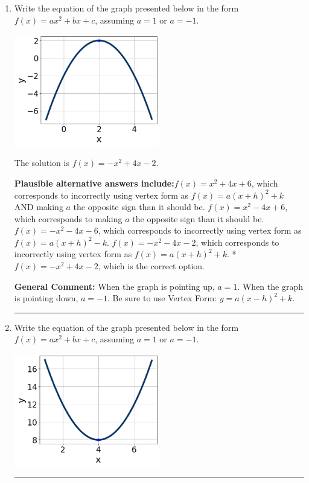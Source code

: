 \documentclass{extbook}[14pt]
\newcommand{\litem}[1]{\item #1

\rule{\textwidth}{0.4pt}}
\begin{document}
\begin{enumerate}\litem{
Write the equation of the graph presented below in the form $f(x)=ax^2+bx+c$, assuming  $a=1$ or $a=-1$.

\begin{center}
    \includegraphics[width=0.5\textwidth]{../Figures/quadraticGraphToEquationCopyA.png}
\end{center}


The solution is \( f(x) = -x^{2} +4 x -2 \).\begin{enumerate}[label=\Alph*.]
\textbf{Plausible alternative answers include:}$f(x)=x^{2} +4 x + 6$, which corresponds to incorrectly using vertex form as $f(x) = a(x+h)^2+k$ AND making $a$ the opposite sign than it should be.
$f(x)=x^{2} -4 x + 6$, which corresponds to making $a$ the opposite sign than it should be.
$f(x)=-x^{2} -4 x -6$, which corresponds to incorrectly using vertex form as $f(x) = a(x+h)^2 - k$.
$f(x)=-x^{2} -4 x -2$, which corresponds to incorrectly using vertex form as $f(x) = a(x+h)^2+k$.
* $f(x)=-x^{2} +4 x -2$, which is the correct option.
\end{enumerate}

\textbf{General Comment:} When the graph is pointing up, $a=1$. When the graph is pointing down, $a=-1$. Be sure to use Vertex Form: $y = a(x-h)^2+k$.
}
\litem{
Write the equation of the graph presented below in the form $f(x)=ax^2+bx+c$, assuming  $a=1$ or $a=-1$.

\begin{center}
    \includegraphics[width=0.5\textwidth]{../Figures/quadraticGraphToEquationA.png}
\end{center}


}
\end{enumerate}
\end{document}
